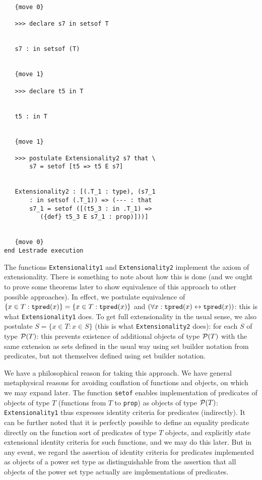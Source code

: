 \documentclass[12pt]{article}
\begin{document}
\begin{verbatim}
   {move 0}

   >>> declare s7 in setsof T


   s7 : in setsof (T)


   {move 1}

   >>> declare t5 in T


   t5 : in T


   {move 1}

   >>> postulate Extensionality2 s7 that \
       s7 = setof [t5 => t5 E s7]


   Extensionality2 : [(.T_1 : type), (s7_1 
       : in setsof (.T_1)) => (--- : that 
       s7_1 = setof ([(t5_3 : in .T_1) => 
          ({def} t5_3 E s7_1 : prop)]))]


   {move 0}
end Lestrade execution
\end{verbatim}

The functions {\tt Extensionality1} and {\tt Extensionality2} implement the axiom of extensionality.  There is something to note about how this is done (and we ought to prove some theorems later to show equivalence of this approach to other possible approaches).  In effect, we postulate
equivalence of $\{x \in T:{\tt tpred}(x)\} = \{x \in T:{\tt tpred}(x)\}$ and $(\forall x:{\tt tpred}(x) \leftrightarrow {\tt tpred}(x))$:  this is what {\tt Extensionality1} does.  To get full extensionality in the usual sense, we also postulate $S = \{x \in T:x \in S\}$ (this is what {\tt Extensionality2} does):  for each $S$ of type ${\cal P}(T)$:  this prevents existence of additional objects
of type ${\cal P}(T)$ with the same extension as sets defined in the usual way using set builder notation from predicates, but not themselves defined using set builder notation.

We have a philosophical reason for taking this approach.  We have general metaphysical reasons for avoiding conflation of functions and objects,
on which we may expand later.  The function {\tt setof} enables implementation of predicates of objects of type $T$ (functions from $T$ to {\tt prop}) as objects of type ${\cal P}(T)$:  {\tt Extensionality1} thus expresses identity criteria for predicates (indirectly).  It can be further noted that it is perfectly possible to define an equality predicate directly on the function sort of predicates of type $T$ objects, and explicitly state extensional identity criteria for such functions, and we may do this later.  But in any event, we regard the assertion of identity criteria for predicates implemented as objects of a power set type as distinguishable from the assertion that all objects of the power set type actually are implementations of predicates.
\end{document}

